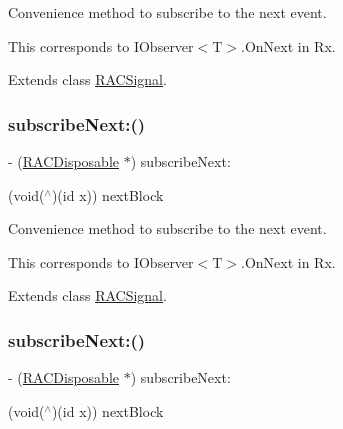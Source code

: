 Convenience method to subscribe to the {\ttfamily next} event.

This corresponds to {\ttfamily I\+Observer$<$T$>$.On\+Next} in Rx. 

Extends class \mbox{\hyperlink{interface_r_a_c_signal_a50d000f05e61411c438e616475deb7f8}{R\+A\+C\+Signal}}.

\mbox{\label{category_r_a_c_signal_07_subscription_08_a50d000f05e61411c438e616475deb7f8}} 
\subsubsection{\texorpdfstring{subscribe\+Next\+:()}{subscribeNext:()}\hspace{0.1cm}{\footnotesize\ttfamily [2/3]}}
{\footnotesize\ttfamily -\/ (\mbox{\hyperlink{interface_r_a_c_disposable}{R\+A\+C\+Disposable}} $\ast$) subscribe\+Next\+: \begin{DoxyParamCaption}\item[{(void($^\wedge$)(id x))}]{next\+Block }\end{DoxyParamCaption}}

Convenience method to subscribe to the {\ttfamily next} event.

This corresponds to {\ttfamily I\+Observer$<$T$>$.On\+Next} in Rx. 

Extends class \mbox{\hyperlink{interface_r_a_c_signal_a50d000f05e61411c438e616475deb7f8}{R\+A\+C\+Signal}}.

\mbox{\label{category_r_a_c_signal_07_subscription_08_a50d000f05e61411c438e616475deb7f8}} 
\subsubsection{\texorpdfstring{subscribe\+Next\+:()}{subscribeNext:()}\hspace{0.1cm}{\footnotesize\ttfamily [3/3]}}
{\footnotesize\ttfamily -\/ (\mbox{\hyperlink{interface_r_a_c_disposable}{R\+A\+C\+Disposable}} $\ast$) subscribe\+Next\+: \begin{DoxyParamCaption}\item[{(void($^\wedge$)(id x))}]{next\+Block }\end{DoxyParamCaption}}

